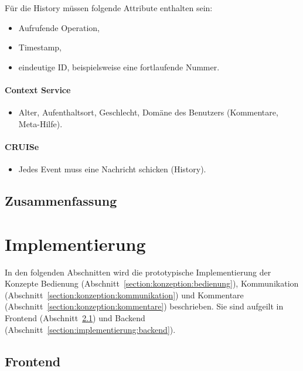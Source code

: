\documentclass[
	headsepline,
	footsepline,
	fontsize=12pt,
	bibliography=totoc
]{scrbook}
\begin{document}
Für die History müssen folgende Attribute enthalten sein:

\begin{itemize}
	\item Aufrufende Operation,
	\item Timestamp,
	\item eindeutige ID, beispielsweise eine fortlaufende Nummer.
\end{itemize}

\subsubsection{Context Service}

\begin{itemize}
	\item Alter, Aufenthaltsort, Geschlecht, Domäne des Benutzers (Kommentare, Meta-Hilfe).
\end{itemize}

\subsubsection{CRUISe}

\begin{itemize}
	\item Jedes Event muss eine Nachricht schicken (History).
\end{itemize}

\section{Zusammenfassung}
\label{section:konzeption:zusammenfassung}


\chapter{Implementierung}
\label{chapter:implementierung}

In den folgenden Abschnitten wird die prototypische Implementierung der Konzepte Bedienung (Abschnitt~\ref{section:konzeption:bedienung}), Kommunikation (Abschnitt~\ref{section:konzeption:kommunikation}) und Kommentare (Abschnitt~\ref{section:konzeption:kommentare}) beschrieben. Sie sind aufgeilt in Frontend (Abschnitt~\ref{section:implementierung:frontend}) und Backend (Abschnitt~\ref{section:implementierung:backend}).

\section{Frontend}
\label{section:implementierung:frontend}
\end{document}
